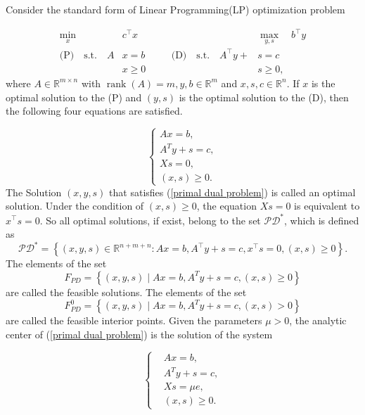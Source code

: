 Consider the standard form of Linear Programming(LP) optimization problem

\begin{equation}\label{primal dual problem}
\begin{aligned}
 \min_{x} \quad &c^{\top} x && \quad &\max_{y, s} \quad b^{\top} y \\
 \text{(P)} \quad \text{s.t.} \quad A &x = b && \quad \text{(D)} \quad \text{s.t.} \quad A^{\top} y+&s = c \\
 &x  \geq 0  && &s \geq 0,
\end{aligned}
\end{equation}
where $A \in \mathbb{R}^{m \times n}$ with $\operatorname{rank}(A)=m, y, b \in \mathbb{R}^m$ and $x, s, c \in \mathbb{R}^n$. If $x$ is the optimal solution to the (P) and $(y, s)$ is the optimal solution to the (D), then the following four equations are satisfied.

\begin{equation}
\left\{\begin{array}{l}
A x=b, \\
A^T y+s=c, \\
X s=0, \\
(x, s) \geq 0.
\end{array}\right.
\end{equation}
The Solution $(x, y, s)$ that satisfies (\ref{primal dual problem}) is called an optimal solution. Under the condition of $(x, s) \geq 0$, the equation $Xs = 0$ is equivalent to $x^{\top}s = 0$. So all optimal solutions, if exist, belong to the set $\mathcal{P} \mathcal{D}^*$, which is defined as
$$
\mathcal{PD}^*=\left\{(x, y, s) \in \mathbb{R}^{n+m+n}: A x=b, A^{\top} y+s=c, x^{\top} s=0,(x, s) \geq 0\right\}.
$$
The elements of the set 
$$
F_{P D}=\left\{(x, y, s) \mid A x=b, A^T y+s=c, (x,s) \geq 0 \right\}
$$
are called the feasible solutions. The elements of the set 
$$
F_{P D}^0=\left\{(x, y, s) \mid A x=b, A^T y+s=c, (x,s) > 0 \right\}
$$
are called the feasible interior points. Given the parameters $\mu>0$, the analytic center of (\ref{primal dual problem}) is the solution of the system

\begin{equation}\label{center path system}
    \left\{
    \begin{aligned}
        & A x=b, \\
        & A^T y+s=c, \\
        & X s=\mu e ,\\
        & (x,s) \geq 0.
    \end{aligned}
    \right.
\end{equation}

